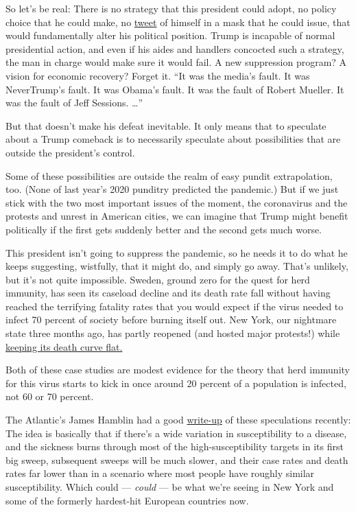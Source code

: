 So let's be real: There is no strategy that this president could adopt,
no policy choice that he could make, no
\href{https://twitter.com/realDonaldTrump/status/1285299379746811915}{tweet}
of himself in a mask that he could issue, that would fundamentally alter
his political position. Trump is incapable of normal presidential
action, and even if his aides and handlers concocted such a strategy,
the man in charge would make sure it would fail. A new suppression
program? A vision for economic recovery? Forget it. ``It was the media's
fault. It was NeverTrump's fault. It was Obama's fault. It was the fault
of Robert Mueller. It was the fault of Jeff Sessions. \ldots{}''

But that doesn't make his defeat inevitable. It only means that to
speculate about a Trump comeback is to necessarily speculate about
possibilities that are outside the president's control.

Some of these possibilities are outside the realm of easy pundit
extrapolation, too. (None of last year's 2020 punditry predicted the
pandemic.) But if we just stick with the two most important issues of
the moment, the coronavirus and the protests and unrest in American
cities, we can imagine that Trump might benefit politically if the first
gets suddenly better and the second gets much worse.

This president isn't going to suppress the pandemic, so he needs it to
do what he keeps suggesting, wistfully, that it might do, and simply go
away. That's unlikely, but it's not quite impossible. Sweden, ground
zero for the quest for herd immunity, has seen its caseload decline and
its death rate fall without having reached the terrifying fatality rates
that you would expect if the virus needed to infect 70 percent of
society before burning itself out. New York, our nightmare state three
months ago, has partly reopened (and hosted major protests!) while
\href{https://www1.nyc.gov/site/doh/covid/covid-19-data-deaths.page}{keeping
its death curve flat.}

Both of these case studies are modest evidence for the theory that herd
immunity for this virus starts to kick in once around 20 percent of a
population is infected, not 60 or 70 percent.

The Atlantic's James Hamblin had a good
\href{https://www.theatlantic.com/health/archive/2020/07/herd-immunity-coronavirus/614035/}{write-up}
of these speculations recently: The idea is basically that if there's a
wide variation in susceptibility to a disease, and the sickness burns
through most of the high-susceptibility targets in its first big sweep,
subsequent sweeps will be much slower, and their case rates and death
rates far lower than in a scenario where most people have roughly
similar susceptibility. Which could --- \emph{could} --- be what we're
seeing in New York and some of the formerly hardest-hit European
countries now.

